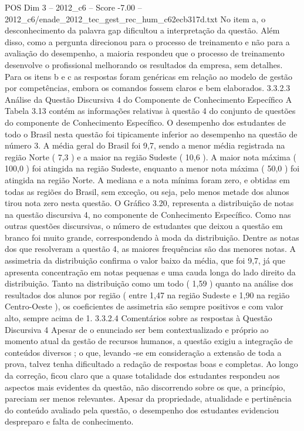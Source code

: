 \begin{textsample}{POS Dim 3 – 2012\_c6 – Score -7.00 – 2012\_c6/enade\_2012\_tec\_gest\_rec\_hum\_c62ecb317d.txt}
No item a, o desconhecimento da palavra gap dificultou a interpretação da questão.
Além disso, como a pergunta direcionou para o processo de treinamento e não para a avaliação do desempenho, a maioria respondeu que o processo de treinamento desenvolve o profissional melhorando os resultados da empresa, sem detalhes.
Para os itens b e c as respostas foram genéricas em relação ao modelo de gestão por competências, embora os comandos fossem claros e bem elaborados. 3.3.2.3 Análise da Questão Discursiva 4 do Componente de Conhecimento Específico A Tabela 3.13 contém as informações relativas à questão 4 do conjunto de questões do componente de Conhecimento Específico.
O desempenho dos estudantes de todo o Brasil nesta questão foi tipicamente inferior ao desempenho na questão de número 3.
A média geral do Brasil foi 9,7, sendo a menor média registrada na região Norte ( 7,3 ) e a maior na região Sudeste ( 10,6 ).
A maior nota máxima ( 100,0 ) foi atingida na região Sudeste, enquanto a menor nota máxima ( 50,0 ) foi atingida na região Norte.
A mediana e a nota mínima foram zero, e obtidas em todas as regiões do Brasil, sem exceção, ou seja, pelo menos metade dos alunos tirou nota zero nesta questão.
O Gráfico 3.20, representa a distribuição de notas na questão discursiva 4, no componente de Conhecimento Específico.
Como nas outras questões discursivas, o número de estudantes que deixou a questão em branco foi muito grande, correspondendo à moda da distribuição.
Dentre as notas dos que resolveram a questão 4, as maiores frequências são das menores notas.
A assimetria da distribuição confirma o valor baixo da média, que foi 9,7, já que apresenta concentração em notas pequenas e uma cauda longa do lado direito da distribuição.
Tanto na distribuição como um todo ( 1,59 ) quanto na análise dos resultados dos alunos por região ( entre 1,47 na região Sudeste e 1,90 na região Centro-Oeste ), os coeficientes de assimetria são sempre positivos e com valor alto, sempre acima de 1. 3.3.2.4 Comentários sobre as respostas à Questão Discursiva 4 Apesar de o enunciado ser bem contextualizado e próprio ao momento atual da gestão de recursos humanos, a questão exigiu a integração de conteúdos diversos ; o que, levando -se em consideração a extensão de toda a prova, talvez tenha dificultado a redação de respostas boas e completas.
Ao longo da correção, ficou claro que a quase totalidade dos estudantes respondeu aos aspectos mais evidentes da questão, não discorrendo sobre os que, a princípio, pareciam ser menos relevantes.
Apesar da propriedade, atualidade e pertinência do conteúdo avaliado pela questão, o desempenho dos estudantes evidenciou despreparo e falta de conhecimento.

\end{textsample}
